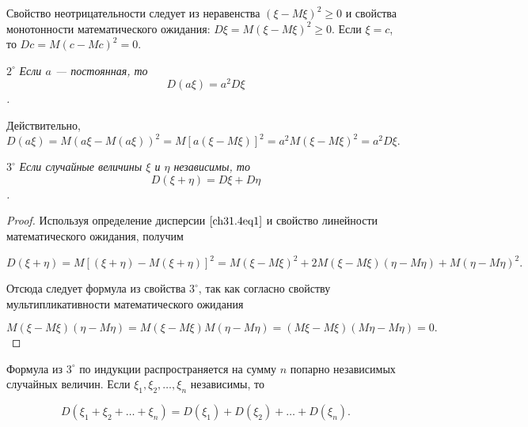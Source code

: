 Свойство неотрицательности следует из неравенства $(\xi - M \xi)^2 \ge 0$ и свойства монотонности математического ожидания: $D \xi = M (\xi - M \xi)^2 \ge 0$. Если $\xi = c$, то $D c = M (c - M c)^2 = 0$. 

$2^{\circ}$ \textit{Если $a$ --- постоянная, то $$D(a\xi) = a^2 D\xi$$.}

Действительно, $D(a\xi) = M(a\xi - M (a\xi))^2 = M [a (\xi - M \xi)]^2 = a^2M(\xi - M\xi)^2 = a^2 D\xi.$

$3^{\circ}$ \textit{Если случайные величины $\xi$ и $\eta$ независимы, то $$D(\xi + \eta) = D\xi + D\eta$$.}

\begin{proof}
Используя определение дисперсии $\eqref{ch31.4eq1}$ и свойство линейности математического ожидания, получим

$$
D(\xi + \eta) = M[(\xi + \eta) - M(\xi + \eta)]^2 = M(\xi - M\xi)^2 + 2M(\xi - M\xi)(\eta - M\eta) + M(\eta  - M\eta)^2.
$$

Отсюда следует формула из свойства $3^{\circ}$, так как согласно свойству мультипликативности математического ожидания

$$
M(\xi - M\xi)(\eta - M\eta) = M(\xi - M\xi)M(\eta - M\eta) = (M\xi - M\xi)(M\eta - M\eta) = 0.
$$


\end{proof}

Формула из $3^{\circ}$ по индукции распространяется на сумму $n$ попарно независимых случайных величин. Если $\xi_1,\xi_2, \ldots, \xi_n$ независимы, то 

$$
D(\xi_1 + \xi_2 + \ldots + \xi_n) = D(\xi_1) + D(\xi_2) + \ldots + D(\xi_n).
$$